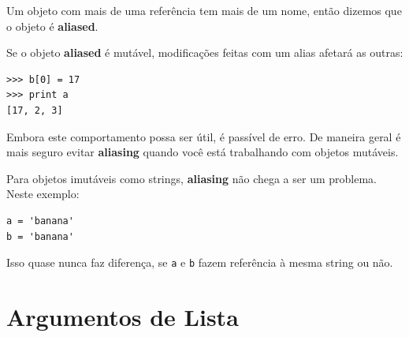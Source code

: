 
Um objeto com mais de uma referência tem mais de um nome,
então dizemos que o objeto é {\bf aliased}.


Se o objeto {\bf aliased} é mutável,
modificações feitas com um alias 
afetará as outras:


\beforeverb
\begin{verbatim}
>>> b[0] = 17
>>> print a
[17, 2, 3]
\end{verbatim}
\afterverb
%

Embora este comportamento possa ser útil, é passível de erro. De maneira
geral é mais seguro evitar {\bf aliasing} quando você está trabalhando com objetos mutáveis.


Para objetos imutáveis como strings, {\bf aliasing} não chega a ser um problema. 
Neste exemplo:

\beforeverb
\begin{verbatim}
a = 'banana'
b = 'banana'
\end{verbatim}
\afterverb
%

Isso quase nunca faz diferença, se {\tt a} e {\tt b} fazem referência à mesma string ou não.

\section{Argumentos de Lista}



